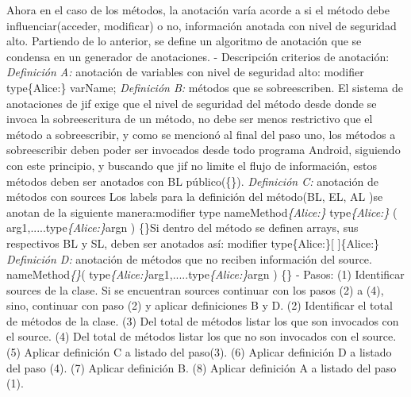 Ahora en el caso de los métodos, la anotación varía acorde a si el método debe
influenciar(acceder, modificar) o no, información anotada con nivel de seguridad
alto.
Partiendo de lo anterior, se define un algoritmo de anotación que se condensa en
un generador de anotaciones.\newline 
- Descripción criterios de anotación:\newline
\textit{Definición A:} anotación de variables con nivel de seguridad alto:
\newline 
modifier type\{Alice:\} varName;\newline 
\textit{Definición B:} métodos que se sobreescriben. El sistema de anotaciones
de jif exige que el nivel de seguridad del método desde donde se invoca la
sobreescritura de un método, no debe ser menos restrictivo que el método a
sobreescribir, y como se mencionó al final del paso uno, los métodos a
sobreescribir deben poder ser invocados desde todo programa Android, siguiendo
con este principio, y buscando que jif no limite el flujo de información, estos
métodos deben ser anotados con BL público(\{\}).\newline 
\textit{Definición C:} anotación de métodos con sources\newline
Los labels para la definición del método(BL, EL, AL )se anotan de la
siguiente manera:\newline modifier type
nameMethod\textit{\{Alice:\}} type\textit{\{Alice:\}}
( arg1,.....type\textit{\{Alice:\}}argn ) \{\}\newline Si dentro del método se
definen arrays, sus respectivos BL y SL, deben ser anotados así: modifier type\{Alice:\}[ ]\{Alice:\}\newline
\textit{Definición D:} anotación de métodos que no reciben información del
source. 
nameMethod\textit{\{\}}(
type\textit{\{Alice:\}}arg1,.....type\textit{\{Alice:\}}argn ) \{\}\newline
- Pasos:\newline
(1) Identificar sources de la clase. Si se encuentran sources continuar con
los pasos (2) a (4), sino, continuar con paso (2) y aplicar definiciones B y
D.\newline
(2) Identificar el total de métodos de la clase.\newline
(3) Del total de métodos listar los que son invocados con el source.\newline
(4) Del total de métodos listar los que no son invocados con el source.\newline
(5) Aplicar definición C a listado del paso(3).\newline
(6) Aplicar definición D a listado del paso (4).\newline
(7) Aplicar definición B. \newline
(8) Aplicar definición A a listado del paso (1).



